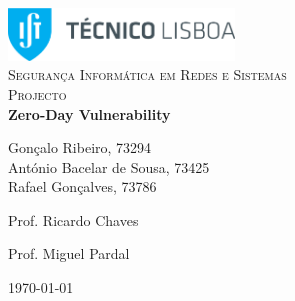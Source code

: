 \begin{titlepage}

	\begin{center}

		\includegraphics[width=6cm]{./title}\\[3cm]

		\textsc{\LARGE Segurança Informática em Redes e Sistemas}\\[1.5cm]

		\textsc{\Large Projecto}\\[1.5cm]


		{ \huge \bfseries Zero-Day Vulnerability \\[2.5cm] }


		\noindent
		\begin{center} \large
			Gonçalo Ribeiro, 73294\\[5mm]

			António Bacelar de Sousa, 73425\\[5mm]

			Rafael Gonçalves, 73786\\[2.5cm]

		\end{center}

		\begin{minipage}{0.4\textwidth}
			\begin{flushleft} \Large
				Prof. Ricardo Chaves
			\end{flushleft}
		\end{minipage}
		\begin{minipage}{0.4\textwidth}
			\begin{flushright} \Large
				Prof. Miguel Pardal
			\end{flushright}
		\end{minipage}

		\vfill

		{\large \today}

	\end{center}

\end{titlepage}